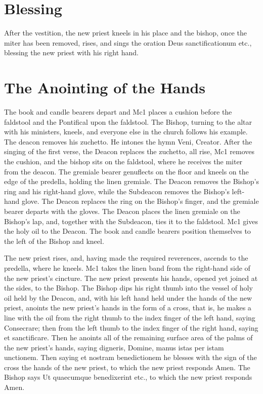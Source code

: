 \documentclass{report}
\begin{document}
{	\section{Blessing}

	After the vestition, the new priest kneels in his place and the bishop,
	once the miter has been removed, rises, and sings the oration Deus
	sanctificationum etc., blessing the new priest with his right hand.

	\section{The Anointing of the Hands}

	The book and candle bearers depart and Mc1 places a cushion before the
	faldstool and the Pontifical upon the faldstool. The Bishop, turning to the
	altar with his ministers, kneels, and everyone else in the church follows
	his example. The deacon removes his zuchetto. He intones the hymn Veni,
	Creator. After the singing of the first verse, the Deacon replaces the
	zuchetto, all rise, Mc1 removes the cushion, and the bishop sits on the
	faldstool, where he receives the miter from the deacon. The gremiale bearer
	genuflects on the floor and kneels on the edge of the predella, holding the
	linen gremiale. The Deacon removes the Bishop’s ring and his right-hand
	glove, while the Subdeacon removes the Bishop’s left-hand glove. The Deacon
	replaces the ring on the Bishop’s finger, and the gremiale bearer departs
	with the gloves. The Deacon places the linen gremiale on the Bishop’s lap,
	and, together with the Subdeacon, ties it to the faldstool. Mc1 gives the
	holy oil to the Deacon. The book and candle bearers position themselves to
	the left of the Bishop and kneel.

	The new priest rises, and, having made the required reverences, ascends to
	the predella, where he kneels. Mc1 takes the linen band from the right-hand
	side of the new priest’s cincture. The new priest presents his hands,
	opened yet joined at the sides, to the Bishop. The Bishop dips his right
	thumb into the vessel of holy oil held by the Deacon, and, with his left
	hand held under the hands of the new priest, anoints the new priest’s hands
	in the form of a cross, that is, he makes a line with the oil from the
	right thumb to the index finger of the left hand, saying Consecrare; then
	from the left thumb to the index finger of the right hand, saying et
	sanctificare. Then he anoints all of the remaining surface area of the
	palms of the new priest’s hands, saying digneris, Domine, manus istas per
	istam unctionem. Then saying et nostram benedictionem he blesses with the
	sign of the cross the hands of the new priest, to which the new priest
	responds Amen. The Bishop says Ut quaecumque benedixerint etc., to which
	the new priest responds Amen.

}
\end{document}
